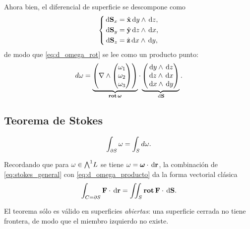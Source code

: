 Ahora bien, el diferencial de superficie se descompone como
\begin{equation}
  \label{eq:dS_componentes}
  \left\{
  \begin{aligned}
    \,\mathrm{d}\mathbf{S}_x&=\hat{\mathbf{x}}\,\mathrm{d} y\wedge\,\mathrm{d} z,\\
    \,\mathrm{d}\mathbf{S}_y&=\hat{\mathbf{y}}\,\mathrm{d} z\wedge\,\mathrm{d} x,\\
    \,\mathrm{d}\mathbf{S}_z&=\hat{\mathbf{z}}\,\mathrm{d} x\wedge\,\mathrm{d} y,
  \end{aligned}
  \right.
\end{equation}
de modo que \eqref{eq:d_omega_rot} se lee como un producto punto:
\begin{equation}
  \label{eq:d_omega_producto}
  d\omega=
  \underbrace{\left( \nabla\wedge
    \begin{pmatrix}\omega_1\\\omega_2\\\omega_3\end{pmatrix} \right)}_{\operatorname{\mathbf{rot}}\boldsymbol{\omega}}
  \cdot
  \underbrace{
  \begin{pmatrix}
    \,\mathrm{d} y\wedge\,\mathrm{d} z\\
    \,\mathrm{d} z\wedge\,\mathrm{d} x\\
    \,\mathrm{d} x\wedge\,\mathrm{d} y
  \end{pmatrix}}_{\,\mathrm{d}\mathbf{S}} .
\end{equation}

\subsection{Teorema de Stokes}
\label{subsec:stokes}

\begin{teorema}
  \label{teo:stokes_general}
  \begin{equation}
    \label{eq:stokes_general}
    \int_{\partial S}\omega=\int_{S}d\omega .
  \end{equation}
\end{teorema}

Recordando que para $\omega\in\textstyle\bigwedge^{1}\!L$ se tiene
$\omega=\boldsymbol{\omega}\cdot\,\mathrm{d}\mathbf{r}$, la combinaci\'on de
\eqref{eq:stokes_general} con \eqref{eq:d_omega_producto} da la forma
vectorial cl\'asica
\begin{equation}
  \label{eq:stokes_vectorial}
  \int_{C=\partial S}\mathbf{F}\cdot\,\mathrm{d}\mathbf{r}
    =\iint_{S}\operatorname{\mathbf{rot}}\mathbf{F}\cdot\,\mathrm{d}\mathbf{S} .
\end{equation}

\begin{observacion}
  El teorema s\'olo es v\'alido en superficies \emph{abiertas}: una superficie
  cerrada no tiene frontera, de modo que el miembro izquierdo no existe.
\end{observacion}

